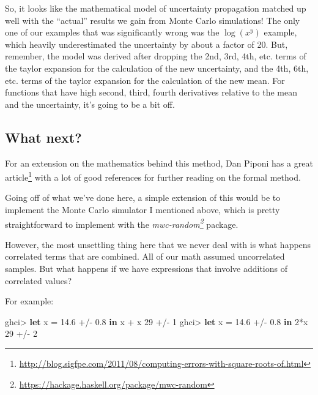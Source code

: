 \documentclass[]{article}
\newenvironment{Shaded}{}{}
\newcommand{\KeywordTok}[1]{\textcolor[rgb]{0.00,0.44,0.13}{\textbf{{#1}}}}
\newcommand{\DecValTok}[1]{\textcolor[rgb]{0.25,0.63,0.44}{{#1}}}
\newcommand{\FloatTok}[1]{\textcolor[rgb]{0.25,0.63,0.44}{{#1}}}
\newcommand{\FunctionTok}[1]{\textcolor[rgb]{0.02,0.16,0.49}{{#1}}}
\newcommand{\NormalTok}[1]{{#1}}
\renewcommand{\href}[2]{#2\footnote{\url{#1}}}
\begin{document}
So, it looks like the mathematical model of uncertainty propagation
matched up well with the ``actual'' results we gain from Monte Carlo
simulations! The only one of our examples that was significantly wrong
was the \(\operatorname{log}(x^y)\) example, which heavily
underestimated the uncertainty by about a factor of 20. But, remember,
the model was derived after dropping the 2nd, 3rd, 4th, etc. terms of
the taylor expansion for the calculation of the new uncertainty, and the
4th, 6th, etc. terms of the taylor expansion for the calculation of the
new mean. For functions that have high second, third, fourth derivatives
relative to the mean and the uncertainty, it's going to be a bit off.

\subsection{What next?}\label{what-next}

For an extension on the mathematics behind this method, Dan Piponi has a
\href{http://blog.sigfpe.com/2011/08/computing-errors-with-square-roots-of.html}{great
article} with a lot of good references for further reading on the formal
method.

Going off of what we've done here, a simple extension of this would be
to implement the Monte Carlo simulator I mentioned above, which is
pretty straightforward to implement with the
\emph{\href{https://hackage.haskell.org/package/mwc-random}{mwc-random}}
package.

However, the most unsettling thing here that we never deal with is what
happens correlated terms that are combined. All of our math assumed
uncorrelated samples. But what happens if we have expressions that
involve additions of correlated values?

For example:

\begin{Shaded}
\begin{Highlighting}[]
\NormalTok{ghci}\FunctionTok{>} \KeywordTok{let} \NormalTok{x }\FunctionTok{=} \FloatTok{14.6} \FunctionTok{+/-} \FloatTok{0.8} \KeywordTok{in} \NormalTok{x }\FunctionTok{+} \NormalTok{x}
\DecValTok{29} \FunctionTok{+/-} \DecValTok{1}
\NormalTok{ghci}\FunctionTok{>} \KeywordTok{let} \NormalTok{x }\FunctionTok{=} \FloatTok{14.6} \FunctionTok{+/-} \FloatTok{0.8} \KeywordTok{in} \DecValTok{2}\FunctionTok{*}\NormalTok{x}
\DecValTok{29} \FunctionTok{+/-} \DecValTok{2}
\end{Highlighting}
\end{Shaded}
\end{document}
